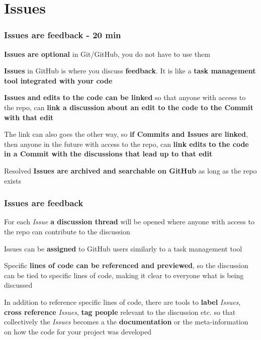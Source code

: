 \documentclass[aspectratio=169]{beamer} %
\begin{document}
\section{Issues}

\begin{frame}
	\frametitle{Issues are feedback - 20 min}
	
	\textbf{Issues are optional} in Git/GitHub, you do not have to use them
	
	\vspace{.20cm}
	
	\textbf{Issues} in GitHub is where you discuss \textbf{feedback}. It is like a \textbf{task management tool integrated with your code}
	
	\vspace{.20cm}
	
	\textbf{Issues and edits to the code can be linked} so that anyone with access to the repo, can \textbf{link a discussion about an edit to the code to the Commit with that edit}
	
	\vspace{.20cm}
	
	The link can also goes the other way, so \textbf{if Commits and Issues are linked}, then anyone in the future with access to the repo, can \textbf{link edits to the code in a Commit with the discussions that lead up to that edit}
	
	\vspace{.20cm}
	
	Resolved \textbf{Issues are archived and searchable on GitHub} as long as the repo exists
\end{frame}

\begin{frame}
	\frametitle{Issues are feedback}
	
	For each \textit{Issue} \textbf{a discussion thread} will be opened where anyone with access to the repo can contribute to the discussion

	\vspace{.25cm}
	
	Issues can be \textbf{assigned} to GitHub users similarly to a task management tool
	
	\vspace{.25cm}
	
	Specific \textbf{lines of code can be referenced and previewed}, so the discussion can be tied to specific lines of code, making it clear to everyone what is being discussed
	
	\vspace{.25cm}
	
	In addition to reference specific lines of code, there are tools to \textbf{label} \textit{Issues}, \textbf{cross reference} \textit{Issues}, \textbf{tag people} relevant to the discussion etc. so that collectively the \textit{Issues} becomes a the \textbf{documentation} or the meta-information on how the code for your project was developed
\end{frame}
\end{document}
